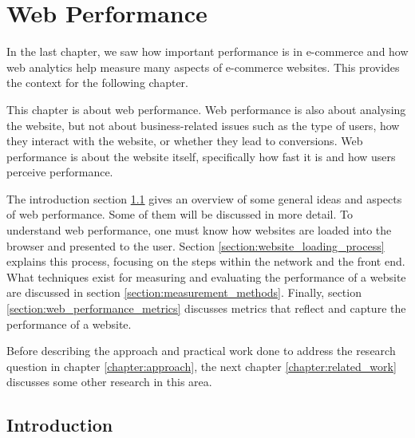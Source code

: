 \chapter{Web Performance} %
\label{chapter:web_performance}



In the last chapter, we saw how important performance is in e-commerce and how web analytics help measure many aspects of e-commerce websites.
This provides the context for the following chapter.


This chapter is about web performance.
Web performance is also about analysing the website, but not about business-related issues such as the type of users, how they interact with the website, or whether they lead to conversions.
Web performance is about the website itself, specifically how fast it is and how users perceive performance.

The introduction section \ref{section:web_performance_introduction} gives an overview of some general ideas and aspects of web performance.
Some of them will be discussed in more detail.
To understand web performance, one must know how websites are loaded into the browser and presented to the user.
Section \ref{section:website_loading_process} explains this process, focusing on the steps within the network and the front end.
What techniques exist for measuring and evaluating the performance of a website are discussed in section \ref{section:measurement_methods}.
Finally, section \ref{section:web_performance_metrics} discusses metrics that reflect and capture the performance of a website.





Before describing the approach and practical work done to address the research question in chapter \ref{chapter:approach}, the next chapter \ref{chapter:related_work} discusses some other research in this area.




\section{Introduction} %
\label{section:web_performance_introduction}


